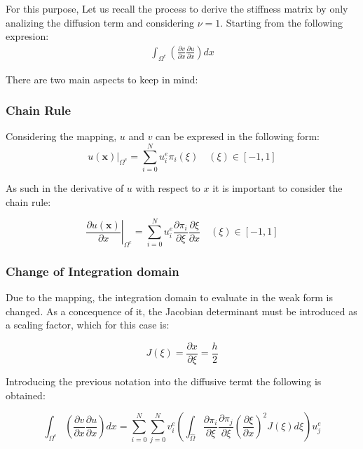 \documentclass[
]{scrartcl}
\begin{document}
For this purpose, Let us recall the process to derive the stiffness
matrix by only analizing the diffusion term and considering \(\nu=1\).
Starting from the following expresion: \begin{align}
\int_{\Omega^{e}} ( \frac{\partial v}{\partial x}\frac{\partial u}{\partial x})dx
\end{align}

There are two main aspects to keep in mind:

\hypertarget{chain-rule}{%
\subsubsection{Chain Rule}\label{chain-rule}}

Considering the mapping, \(u\) and \(v\) can be expresed in the
following form: \begin{equation}
\left.u(\textbf{x})\right\rvert_{\Omega^{e}}=\sum_{i=0}^{N}u_{i}^{e} \pi_{i}(\xi)  \quad (\xi) \in [-1,1]
\end{equation}

As such in the derivative of \(u\) with respect to \(x\) it is important
to consider the chain rule:

\begin{equation}
\left. \frac{\partial u(\textbf{x})}{\partial x}\right\rvert_{\Omega^{e}}=\sum_{i=0}^{N} u_{i}^{e} \frac{\partial \pi_{i}}{\partial\xi}\frac{\partial\xi}{\partial x}  \quad (\xi) \in [-1,1]
\end{equation}

\hypertarget{change-of-integration-domain}{%
\subsubsection{Change of Integration
domain}\label{change-of-integration-domain}}

Due to the mapping, the integration domain to evaluate in the weak form
is changed. As a concequence of it, the Jacobian determinant must be
introduced as a scaling factor, which for this case is:

\begin{equation}
J(\xi)=\frac{\partial x}{\partial \xi}=\frac{h}{2}
\end{equation}

Introducing the previous notation into the diffusive termt the following
is obtained:

\begin{equation}
\int_{\Omega^{e}} ( \frac{\partial v}{\partial x}\frac{\partial u}{\partial x})dx = \sum_{i=0}^{N}\sum_{j=0}^{N} v_i^{e}( \int_{\hat{\Omega}}\frac{\partial \pi_{i}}{\partial\xi}\frac{\partial \pi_{j}}{\partial\xi}(\frac{\partial\xi}{\partial x})^{2} J(\xi) d\xi)u_j^{e}
\end{equation}
\end{document}
